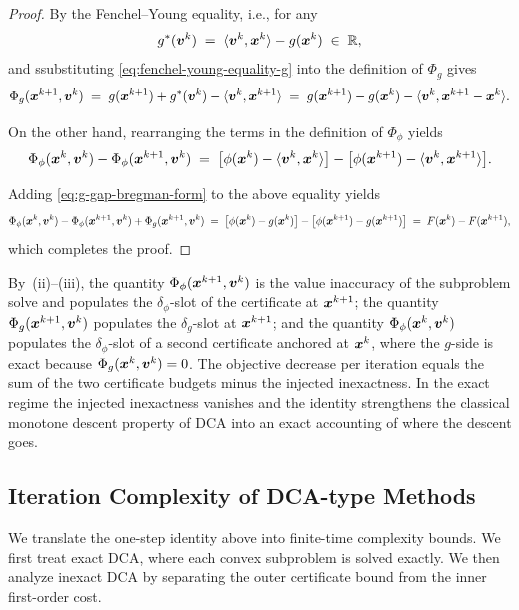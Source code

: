 \documentclass[english]{article}
\begin{document}
\begin{proof}
By the Fenchel--Young equality, i.e.,  for any 
\begin{equation}
    g^*(\bm{v}^k)
    \;=\;
    \langle\bm{v}^k,\bm{x}^k\rangle-g(\bm{x}^k)
    \;\in\;\mathbb{R},
    \label{eq:fenchel-young-equality-g}
\end{equation} and 
ssubstituting \eqref{eq:fenchel-young-equality-g} into the definition of
$\Phi_g$ gives
\begin{equation}
    \Phi_g(\bm{x}^{k+1},\bm{v}^k)
    \;=\;
    g(\bm{x}^{k+1})+g^*(\bm{v}^k)-\langle\bm{v}^k,\bm{x}^{k+1}\rangle
    \;=\;
    g(\bm{x}^{k+1})-g(\bm{x}^k)-\langle\bm{v}^k,\bm{x}^{k+1}-\bm{x}^k\rangle.
    \label{eq:g-gap-bregman-form}
\end{equation}

On the other hand, rearranging the terms in the definition of
$\Phi_\phi$ yields
\[
    \Phi_\phi(\bm{x}^k,\bm{v}^k)-\Phi_\phi(\bm{x}^{k+1},\bm{v}^k)
    \;=\;
    \bigl[\phi(\bm{x}^k)-\langle\bm{v}^k,\bm{x}^k\rangle\bigr]
    -\bigl[\phi(\bm{x}^{k+1})-\langle\bm{v}^k,\bm{x}^{k+1}\rangle\bigr].
\]

Adding \eqref{eq:g-gap-bregman-form} to the above equality yields
\[
    \Phi_\phi(\bm{x}^k,\bm{v}^k)-\Phi_\phi(\bm{x}^{k+1},\bm{v}^k)
    +\Phi_g(\bm{x}^{k+1},\bm{v}^k)
    \;=\;
    \bigl[\phi(\bm{x}^k)-g(\bm{x}^k)\bigr]
    -\bigl[\phi(\bm{x}^{k+1})-g(\bm{x}^{k+1})\bigr]
    \;=\;
    F(\bm{x}^k)-F(\bm{x}^{k+1}),
\]
which completes the proof.
\end{proof}
By
\,(ii)--(iii), the quantity
$\Phi_\phi(\bm{x}^{k+1},\bm{v}^k)$ is the value inaccuracy of the subproblem
solve and populates the $\delta_\phi$-slot of the certificate at
$\bm{x}^{k+1}$; the quantity $\Phi_g(\bm{x}^{k+1},\bm{v}^k)$ populates the
$\delta_g$-slot at $\bm{x}^{k+1}$; and the quantity $\Phi_\phi(\bm{x}^k,\bm{v}^k)$
populates the $\delta_\phi$-slot of a second certificate anchored at
$\bm{x}^k$, where the $g$-side is exact because $\Phi_g(\bm{x}^k,\bm{v}^k)=0$. The
objective decrease per iteration equals the sum of the two certificate
budgets minus the injected inexactness. In the exact regime the injected
inexactness vanishes and the identity strengthens the classical monotone
descent property of DCA \citep{lethi2009dc,abbaszadehpeivasti2023rate}
into an exact accounting of where the descent goes.

\subsection{Iteration Complexity of DCA-type Methods}
We translate the one-step identity above into finite-time complexity
bounds. We first treat exact DCA, where each convex subproblem is solved
exactly. We then analyze inexact DCA by separating the outer certificate
bound from the inner first-order cost.
\end{document}
